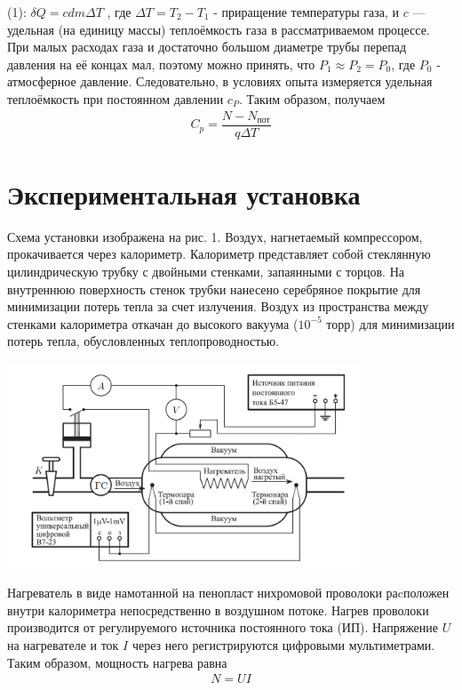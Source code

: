\documentclass[a4paper, 12pt]{article}%
\begin{document}
(1): $\delta Q =c dm \Delta T$ , где $\Delta T = T_2 - T_1$ - приращение температуры газа, и $c$ — удельная (на единицу массы) теплоёмкость газа в рассматриваемом процессе. При малых расходах газа и достаточно большом диаметре трубы перепад давления на её концах мал, поэтому можно принять, что $P_1 \approx P_2 = P_0$, где $P_0$ - атмосферное давление. Следовательно, в условиях опыта измеряется удельная теплоёмкость при постоянном давлении $c_P$. Таким образом, получаем
\begin{equation}
\begin{aligned}
C_p = \dfrac{N - N_{\text{пот}}}{q \Delta T} 
\end{aligned}
\end{equation}
\section{Экспериментальная установка}
Схема установки изображена на рис. 1. Воздух, нагнетаемый компрессором, прокачивается через калориметр. Калориметр представляет собой стеклянную цилиндрическую трубку с двойными стенками, запаянными с торцов. На внутреннюю поверхность стенок трубки нанесено серебряное покрытие для минимизации потерь тепла за счет излучения. Воздух из пространства между стенками калориметра откачан до высокого вакуума ($10^{-5}$ торр) для минимизации потерь тепла, обусловленных теплопроводностью.
\begin{center}
\includegraphics[width = 0.8\textwidth]{Fig.2.png}
\end{center}
Нагреватель в виде намотанной на пенопласт нихромовой проволоки раcположен внутри калориметра непосредственно в воздушном потоке. Нагрев проволоки производится от регулируемого источника постоянного тока (ИП). Напряжение $U$ на нагревателе и ток $I$ через него регистрируются цифровыми мультиметрами. Таким образом, мощность нагрева равна
\begin{equation}
\begin{aligned}
N = UI 
\end{aligned}
\end{equation}
\end{document}
